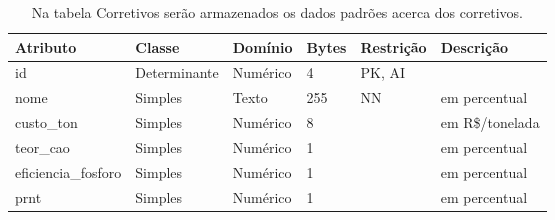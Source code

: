 \begin{landscape}
    \label{sec:titSubSecCorretivos}

    \begin{table}[H]
        \centering
        \caption[Tabela corretivos]{Na tabela Corretivos serão armazenados os dados padrões acerca dos corretivos.
            \label{tab:tabela-er-corretivos}}
        \begin{tabular}{|p{4cm}|p{3cm}|p{2cm}|p{1cm}|p{2cm}|p{8cm}|}
            \hline
            Atributo            & Classe       & Domínio  & Bytes & Restrição & Descrição       \\\hline
            id                  & Determinante & Numérico & 4     & PK, AI    &                 \\\hline
            nome                & Simples      & Texto    & 255   & NN        & em percentual   \\\hline
            custo\_ton          & Simples      & Numérico & 8     &           & em R\$/tonelada \\\hline
            teor\_cao           & Simples      & Numérico & 1     &           & em percentual   \\\hline
            eficiencia\_fosforo & Simples      & Numérico & 1     &           & em percentual   \\\hline
            prnt                & Simples      & Numérico & 1     &           & em percentual   \\\hline
        \end{tabular}
    \end{table}

\end{landscape}
